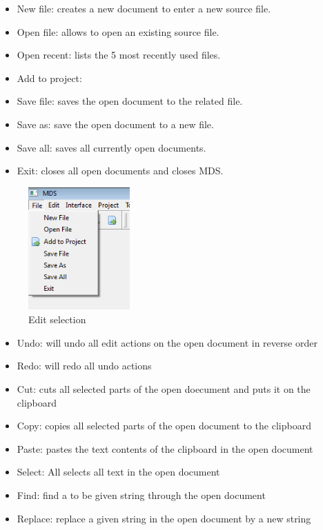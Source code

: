     \begin{itemize}
        \item New file: creates a new document to enter a new source file.
        \item Open file: allows to open an existing source file.
        \item Open recent: lists the 5 most recently used files.
        \item Add to project:
        \item Save file: saves the open document to the related file.
        \item Save as: save the open document to a new file.
        \item Save all: saves all currently open documents.
        \item Exit: closes all open documents and closes MDS.
    \end{itemize}

    \begin{figure}
            \centering
            \includegraphics[width=110pt]{img/menu_file.png}
            \caption{Edit selection}
    \end{figure}

    \begin{itemize}
        \item Undo: will undo all edit actions on the open document in reverse order
        \item Redo: will redo all undo actions
        \item Cut: cuts all selected parts of the open doecument and puts it on the clipboard
        \item Copy: copies all selected parts of the open document to the clipboard
        \item Paste: pastes the text contents of the clipboard in the open document
        \item Select: All selects all text in the open document
        \item Find: find a to be given string through the open document
        \item Replace: replace a given string in the open document by a new string
    \end{itemize}

